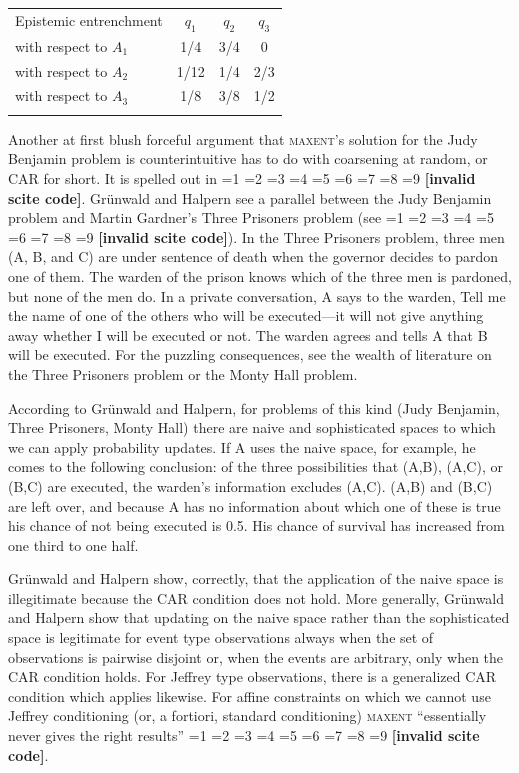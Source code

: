 \documentclass[smallextended]{svjour3}       %
\newcommand{\nias}{\noindent} %
\newcommand{\nonsc}[1]{}
\newcommand{\qeins}[1]{``#1''}
\newcommand{\PageP}{p.~}
\newcommand{\PageP}{}
\newcommand{\scite}[3]{\ifnum#1=1\cite{#2}\else
\ifnum#1=2\cite[{\PageP}~#3]{#2}\else
\ifnum#1=3\cite[{\PageP}~#3]{#2}\else
\ifnum#1=4\cite{#2}\else
\ifnum#1=5\cite{#2}\else
\ifnum#1=6\cite[{\PageP}~#3]{#2}\else
\ifnum#1=7\cite{#2}\else
\ifnum#1=8\cite[{\PageP}~#3]{#2}\else
\ifnum#1=9\cite[{\PageP}~#3]{#2}\else
\textbf{[invalid scite code]}\fi\fi\fi\fi\fi\fi\fi\fi\fi}
\begin{document}
\begin{table}
\label{tab:1}       %
\begin{tabular}{|l|c|c|c|}
\hline\noalign{\smallskip}
Epistemic entrenchment & $q_{1}$ & $q_{2}$ & $q_{3}$ \\
\noalign{\smallskip}\hline\noalign{\smallskip}
with respect to $A_{1}$ & 1/4 & 3/4 & 0 \\
with respect to $A_{2}$ & 1/12 & 1/4 & 2/3 \\
with respect to $A_{3}$ & 1/8 & 3/8 & 1/2 \\
\noalign{\smallskip}\hline
\end{tabular}
\end{table}

\bigskip

\nias Another at first blush forceful argument that \textsc{maxent}'s
solution for the Judy Benjamin problem is counterintuitive has to do
with coarsening at random, or CAR for short. It is spelled out in
\scite{1}{gruenwaldhalpern03}{}\nonsc{}. Gr{\"u}nwald and Halpern see
a parallel between the Judy Benjamin problem and Martin Gardner's
Three Prisoners problem (see \scite{8}{gardner59}{180f}). In the Three
Prisoners problem, three men (A, B, and C) are under sentence of death
when the governor decides to pardon one of them. The warden of the
prison knows which of the three men is pardoned, but none of the men
do. In a private conversation, A says to the warden, Tell me the name
of one of the others who will be executed---it will not give anything
away whether I will be executed or not. The warden agrees and tells A
that B will be executed. For the puzzling consequences, see the wealth
of literature on the Three Prisoners problem or the Monty Hall
problem.

According to Gr{\"u}nwald and Halpern, for problems of this kind (Judy
Benjamin, Three Prisoners, Monty Hall) there are naive and
sophisticated spaces to which we can apply probability updates. If A
uses the naive space, for example, he comes to the following
conclusion: of the three possibilities that (A,B), (A,C), or (B,C) are
executed, the warden's information excludes (A,C). (A,B) and (B,C) are
left over, and because A has no information about which one of these
is true his chance of not being executed is 0.5. His chance of
survival has increased from one third to one half. 

Gr{\"u}nwald and Halpern show, correctly, that the application of the
naive space is illegitimate because the CAR condition does not hold.
More generally, Gr{\"u}nwald and Halpern show that updating on the
naive space rather than the sophisticated space is legitimate for
event type observations always when the set of observations is
pairwise disjoint or, when the events are arbitrary, only when the CAR
condition holds. For Jeffrey type observations, there is a generalized
CAR condition which applies likewise. For affine constraints on which
we cannot use Jeffrey conditioning (or, a fortiori, standard
conditioning) \textsc{maxent }\qeins{essentially never gives the right
  results} \scite{2}{gruenwaldhalpern03}{243}.
\end{document}
